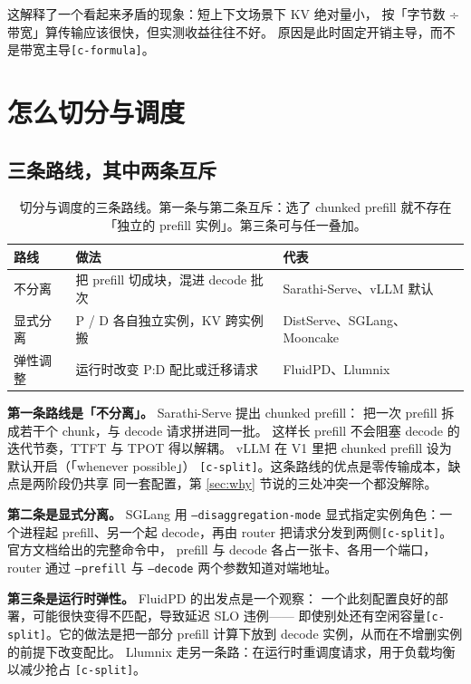 这解释了一个看起来矛盾的现象：短上下文场景下 KV 绝对量小，
按「字节数 ÷ 带宽」算传输应该很快，但实测收益往往不好。
原因是此时固定开销主导，而不是带宽主导\texttt{[c-formula]}。

\section{怎么切分与调度}
\label{sec:split}

\subsection{三条路线，其中两条互斥}

\begin{table}[t]
\centering
\caption{切分与调度的三条路线。第一条与第二条互斥：选了 chunked prefill
就不存在「独立的 prefill 实例」。第三条可与任一叠加。}
\label{tab:routes}
\small
\begin{tabular}{@{}p{1.5cm}p{2.3cm}p{2.4cm}@{}}
\toprule
路线 & 做法 & 代表 \\
\midrule
不分离 & 把 prefill 切成块，混进 decode 批次 & Sarathi-Serve、vLLM 默认 \\
显式分离 & P / D 各自独立实例，KV 跨实例搬 & DistServe、SGLang、Mooncake \\
弹性调整 & 运行时改变 P:D 配比或迁移请求 & FluidPD、Llumnix \\
\bottomrule
\end{tabular}
\end{table}

\textbf{第一条路线是「不分离」。} Sarathi-Serve 提出 chunked prefill：
把一次 prefill 拆成若干个 chunk，与 decode 请求拼进同一批。
这样长 prefill 不会阻塞 decode 的迭代节奏，TTFT 与 TPOT 得以解耦。
vLLM 在 V1 里把 chunked prefill 设为默认开启（「whenever possible」）
\texttt{[c-split]}。这条路线的优点是零传输成本，缺点是两阶段仍共享
同一套配置，第 \ref{sec:why} 节说的三处冲突一个都没解除。

\textbf{第二条是显式分离。} SGLang 用 \texttt{--disaggregation-mode}
显式指定实例角色：一个进程起 prefill、另一个起 decode，再由 router
把请求分发到两侧\texttt{[c-split]}。官方文档给出的完整命令中，
prefill 与 decode 各占一张卡、各用一个端口，router 通过
\texttt{--prefill} 与 \texttt{--decode} 两个参数知道对端地址。

\textbf{第三条是运行时弹性。} FluidPD 的出发点是一个观察：
一个此刻配置良好的部署，可能很快变得不匹配，导致延迟 SLO 违例——
即使别处还有空闲容量\texttt{[c-split]}。它的做法是把一部分 prefill
计算下放到 decode 实例，从而在不增删实例的前提下改变配比。
Llumnix 走另一条路：在运行时重调度请求，用于负载均衡以减少抢占
\texttt{[c-split]}。

